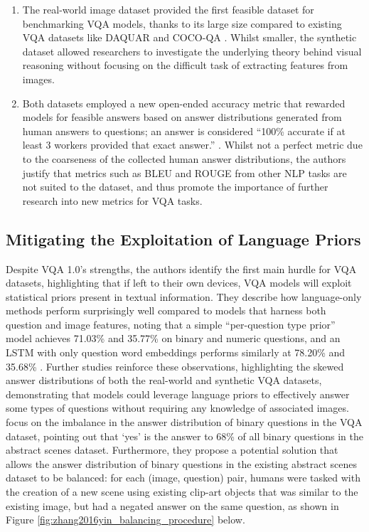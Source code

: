 \begin{enumerate}
    \item The real-world image dataset provided the first feasible dataset for benchmarking VQA models, thanks to its large size compared to existing VQA datasets like DAQUAR \cite{malinowski2014multiworld} and COCO-QA \cite{ren2015exploring}. Whilst smaller, the synthetic dataset allowed researchers to investigate the underlying theory behind visual reasoning without focusing on the difficult task of extracting features from images.
    \item Both datasets employed a new open-ended accuracy metric that rewarded models for feasible answers based on answer distributions generated from human answers to questions; an answer is considered ``100\% accurate if at least 3 workers provided that exact answer.'' \citeauthor{antol2015vqa}. Whilst not a perfect metric due to the coarseness of the collected human answer distributions, the authors justify that metrics such as BLEU and ROUGE from other NLP tasks are not suited to the dataset, and thus promote the importance of further research into new metrics for VQA tasks.
\end{enumerate}


\subsection{Mitigating the Exploitation of Language Priors} 

Despite VQA 1.0's strengths, the authors identify the first main hurdle for VQA datasets, highlighting that if left to their own devices, VQA models will exploit statistical priors present in textual information. They describe how language-only methods perform surprisingly well compared to models that harness both question and image features, noting that a simple ``per-question type prior'' model achieves 71.03\% and 35.77\% on binary and numeric questions, and an LSTM with only question word embeddings performs similarly at 78.20\% and 35.68\%  \cite{antol2015vqa}. Further studies \cite{goyal2017making, zhang2016yin} reinforce these observations, highlighting the skewed answer distributions of both the real-world and synthetic VQA datasets, demonstrating that models could leverage language priors to effectively answer some types of questions without requiring any knowledge of associated images. \citeauthor{zhang2016yin} focus on the imbalance in the answer distribution of binary questions in the VQA dataset, pointing out that `yes' is the answer to 68\% of all binary questions in the abstract scenes dataset. Furthermore, they propose a potential solution that allows the answer distribution of binary questions in the existing abstract scenes dataset to be balanced: for each (image, question) pair, humans were tasked with the creation of a new scene using existing clip-art objects \cite{zitnick2013bringing} that was similar to the existing image, but had a negated answer on the same question, as shown in Figure \ref{fig:zhang2016yin_balancing_procedure} below.

